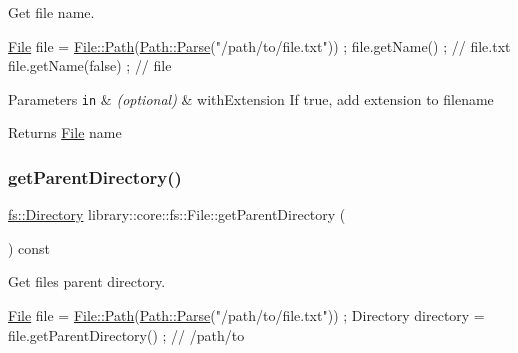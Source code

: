 Get file name. 


\begin{DoxyCode}
\hyperlink{classlibrary_1_1core_1_1fs_1_1_file_a7490060f19a21d4ee58bb6cec87a1ca6}{File} file = \hyperlink{classlibrary_1_1core_1_1fs_1_1_file_a0e0d8a8becb3cdd21775554e181452d8}{File::Path}(\hyperlink{classlibrary_1_1core_1_1fs_1_1_path_aebf5bd3af83e0b7376616e146f3e55df}{Path::Parse}(\textcolor{stringliteral}{"/path/to/file.txt"})) ;
file.getName() ; \textcolor{comment}{// file.txt}
file.getName(\textcolor{keyword}{false}) ; \textcolor{comment}{// file}
\end{DoxyCode}



\begin{DoxyParams}[1]{Parameters}
\mbox{\tt in}  & {\em (optional)} & with\+Extension If true, add extension to filename \\
\hline
\end{DoxyParams}
\begin{DoxyReturn}{Returns}
\hyperlink{classlibrary_1_1core_1_1fs_1_1_file}{File} name 
\end{DoxyReturn}
\mbox{\label{classlibrary_1_1core_1_1fs_1_1_file_a8eb74097f9bdc9d3c626fe4924bf405e}} 
\subsubsection{\texorpdfstring{get\+Parent\+Directory()}{getParentDirectory()}}
{\footnotesize\ttfamily \hyperlink{classlibrary_1_1core_1_1fs_1_1_directory}{fs\+::\+Directory} library\+::core\+::fs\+::\+File\+::get\+Parent\+Directory (\begin{DoxyParamCaption}{ }\end{DoxyParamCaption}) const}



Get file\textquotesingle{}s parent directory. 


\begin{DoxyCode}
\hyperlink{classlibrary_1_1core_1_1fs_1_1_file_a7490060f19a21d4ee58bb6cec87a1ca6}{File} file = \hyperlink{classlibrary_1_1core_1_1fs_1_1_file_a0e0d8a8becb3cdd21775554e181452d8}{File::Path}(\hyperlink{classlibrary_1_1core_1_1fs_1_1_path_aebf5bd3af83e0b7376616e146f3e55df}{Path::Parse}(\textcolor{stringliteral}{"/path/to/file.txt"})) ;
Directory directory = file.getParentDirectory() ; \textcolor{comment}{// /path/to}
\end{DoxyCode}


